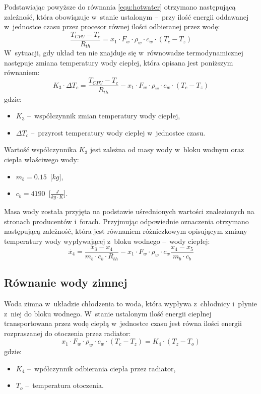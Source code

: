Podstawiając powyższe do równania \eqref{equ:hotwater} otrzymano następującą
zależność, która obowiązuje w~stanie ustalonym --~przy ilość energii oddawanej
w~jednostce czasu przez procesor równej ilości odbieranej przez wodę:
\begin{equation}
    \frac{T_{CPU} - T_c}{R_{th}} = x_1 \cdot F_w \cdot \rho_w \cdot c_w \cdot
    \left( T_c - T_z \right)
    \label{equ:hotwaterfull}
\end{equation}
W~sytuacji, gdy układ ten nie znajduje się w~równowadze termodynamicznej
następuje zmiana temperatury wody ciepłej, która opisana jest poniższym
równaniem:
\begin{equation}
    K_3 \cdot \Delta T_c = \frac{T_{CPU} - T_c}{R_{th}} - x_1 \cdot F_w \cdot
    \rho_w \cdot c_w \cdot \left( T_c - T_z \right)
    \label{equ:dtc}
\end{equation}
gdzie:
\begin{itemize}
    \item $K_3$ --~współczynnik zmian temperatury wody ciepłej,
    \item $\Delta T_c$ --~przyrost temperatury wody ciepłej w~jednostce czasu.
\end{itemize}

Wartość współczynnika $K_3$ jest zależna od masy wody w~bloku wodnym oraz
ciepła właściwego wody:
\begin{itemize}
    \item $m_b = 0.15$~[$kg$],
    \item $c_b = 4190$~[$\frac{J}{kg \cdot K}$].
\end{itemize}
Masa wody została przyjęta na podstawie uśrednionych wartości znalezionych na
stronach producentów i~forach. Przyjmując odpowiednie oznaczenia otrzymano
następującą zależność, która jest równaniem różniczkowym opisującym zmiany
temperatury wody wypływającej z~bloku wodnego --~wody ciepłej:
\begin{equation}
    \dot{x_4} = \frac{x_3 - x_4}{m_b \cdot c_b \cdot R_{th}} - x_1 \cdot F_w
    \cdot \rho_w \cdot c_w \frac{x_4 - x_5}{m_b \cdot c_b}
    \label{equ:x4}
\end{equation}

\subsection{Równanie wody zimnej}
\indent

Woda zimna w~układzie chłodzenia to woda, która wypływa z~chłodnicy i~płynie
z~niej do bloku wodnego. W~stanie ustalonym ilość energii cieplnej
transportowana przez wodę ciepłą w~jednostce czasu jest równa ilości energii
rozpraszanej do otoczenia przez radiator:
\begin{equation}
    x_1 \cdot F_w \cdot \rho_w \cdot c_w \cdot \left( T_c - T_z \right) = K_4
    \cdot \left( T_z - T_o \right)
    \label{equ:coldwater}
\end{equation}
gdzie:
\begin{itemize}
    \item $K_4$ --~wpółczynnik odbierania ciepła przez radiator,
    \item $T_o$ --~temperatura otoczenia.
\end{itemize}

